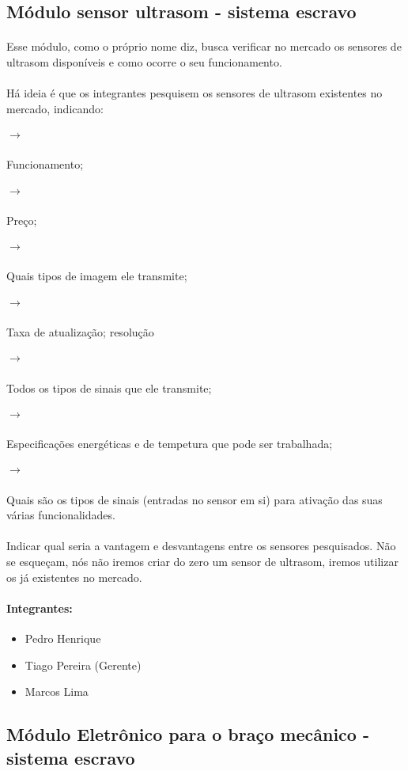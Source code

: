 \documentclass[a4paper]{article}
\begin{document}
\subsection{Módulo sensor ultrasom - sistema escravo}

\paragraph{} Esse módulo, como o próprio nome diz, busca verificar no mercado os sensores de ultrasom disponíveis e como ocorre o seu funcionamento. 

\paragraph{} Há ideia é que os integrantes pesquisem os sensores de ultrasom existentes no mercado, indicando:
\subparagraph{$\rightarrow$} Funcionamento;
\subparagraph{$\rightarrow$} Preço; 
\subparagraph{$\rightarrow$} Quais tipos de imagem ele transmite; 
\subparagraph{$\rightarrow$} Taxa de atualização;
 resolução
\subparagraph{$\rightarrow$} Todos os tipos de sinais que ele transmite; 
\subparagraph{$\rightarrow$} Especificações energéticas e de tempetura que pode ser trabalhada;
\subparagraph{$\rightarrow$} Quais são os tipos de sinais (entradas no sensor em si) para ativação das suas várias funcionalidades.

\paragraph{}Indicar qual seria a vantagem e desvantagens entre os sensores pesquisados. Não se esqueçam, nós não iremos criar do zero um sensor de ultrasom, iremos utilizar os já existentes no mercado.

\paragraph{Integrantes:}
\begin{itemize}
\item Pedro Henrique
\item Tiago Pereira (Gerente)
\item Marcos Lima
\end{itemize}

\subsection{Módulo Eletrônico para o braço mecânico - sistema escravo}
\end{document}

